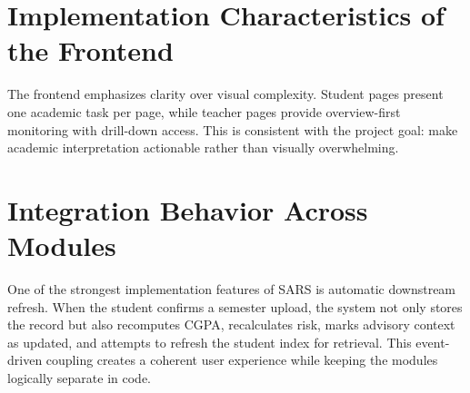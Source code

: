 \section{Implementation Characteristics of the Frontend}
The frontend emphasizes clarity over visual complexity. Student pages present one academic task per page, while teacher pages provide overview-first monitoring with drill-down access. This is consistent with the project goal: make academic interpretation actionable rather than visually overwhelming.

\section{Integration Behavior Across Modules}
One of the strongest implementation features of SARS is automatic downstream refresh. When the student confirms a semester upload, the system not only stores the record but also recomputes CGPA, recalculates risk, marks advisory context as updated, and attempts to refresh the student index for retrieval. This event-driven coupling creates a coherent user experience while keeping the modules logically separate in code.

